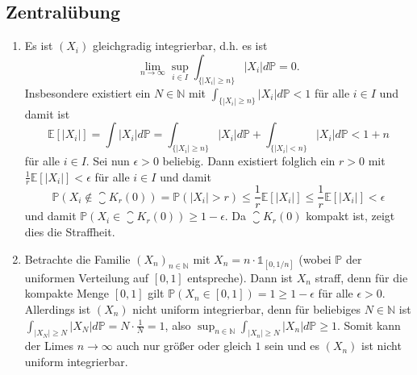\documentclass[a4paper]{article}
\begin{document}
\makeexheader

\subsection{Zentralübung}


\begin{enumerate}
    \item Es ist $(X_i)$ gleichgradig integrierbar, d.h. es ist 
    \begin{equation*}
        \lim_{n \to \infty} \sup_{i \in I} \int_{\{|X_i| \geq n\}} |X_i| d \mathds{P} = 0\text{.}
    \end{equation*}
    Insbesondere existiert ein $N \in \mathds{N}$ mit $\int_{\{|X_i| \geq n\}} |X_i| d \mathds{P} < 1$ für alle $i \in I$ und damit ist
    \begin{equation*}
        \mathds{E}[|X_i|] = \int |X_i| d \mathds{P} = \int_{\{|X_i| \geq n\}} |X_i| d \mathds{P} + \int_{\{|X_i| < n\}} |X_i| d\mathds{P} < 1 + n 
    \end{equation*}
    für alle $i \in I$. Sei nun $\epsilon > 0$ beliebig.
    Dann existiert folglich ein $r > 0$ mit $\frac{1}{r} \mathds{E}[|X_i|] < \epsilon$ für alle $i \in I$ und damit
    \begin{equation*}
        \mathds{P}(X_i \notin \closure{K_r(0)}) = \mathds{P}(|X_i| > r) \leq \frac{1}{r} \mathds{E}[|X_i|] \leq \frac{1}{r} \mathds{E}[|X_i|] < \epsilon
    \end{equation*}
    und damit $\mathds{P}(X_i \in \closure{K_r(0)}) \geq 1 - \epsilon$. Da $\closure{K_r(0)}$ kompakt ist, zeigt dies die Straffheit.
    \item Betrachte die Familie $(X_n)_{n \in \mathds{N}}$ mit $X_n = n \cdot \mathds{1}_{[0, 1/n]}$ (wobei $\mathds{P}$ der uniformen Verteilung auf $[0,1]$ entspreche). 
    Dann ist $X_n$ straff, denn für die kompakte Menge $[0,1]$ gilt $\mathds{P}(X_n \in [0,1]) = 1 \geq 1 - \epsilon$ für alle $\epsilon > 0$. 
    Allerdings ist $(X_n)$ nicht uniform integrierbar, denn für beliebiges $N \in \mathds{N}$ ist $\int_{|X_{N}| \geq N} |X_N| d \mathds{P} = N \cdot \frac{1}{N} = 1$, also $\sup_{n \in \mathds{N}}  \int_{|X_{n}| \geq N} |X_n| d \mathds{P} \geq 1$.
    Somit kann der Limes $n \to \infty$ auch nur größer oder gleich $1$ sein und es $(X_n)$ ist nicht uniform integrierbar.
\end{enumerate}


\subsection{}
\end{document}
